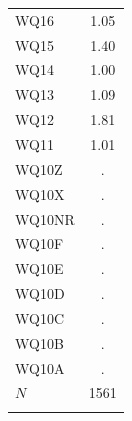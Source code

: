 \begin{table}[htbp]
\begin{tabular}{l*{1}{c}}
WQ16        &        1.05\\
WQ15        &        1.40\\
WQ14        &        1.00\\
WQ13        &        1.09\\
WQ12        &        1.81\\
WQ11        &        1.01\\
WQ10Z       &           .\\
WQ10X       &           .\\
WQ10NR      &           .\\
WQ10F       &           .\\
WQ10E       &           .\\
WQ10D       &           .\\
WQ10C       &           .\\
WQ10B       &           .\\
WQ10A       &           .\\
\hline
\(N\)       &        1561\\
\hline\hline
\multicolumn{2}{p{0.95\linewidth}}{\scriptsize }\\
\end{tabular}
\end{table}
